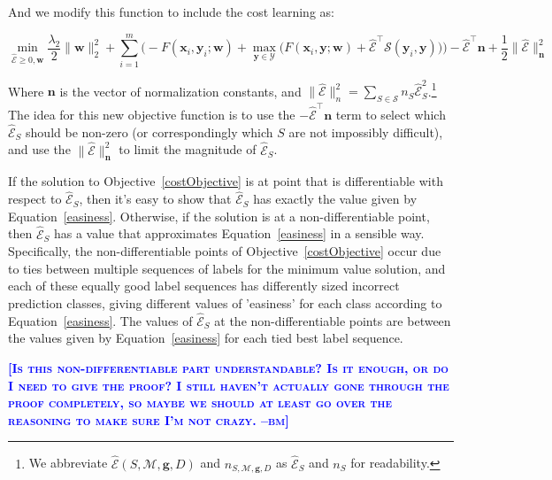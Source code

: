 \documentclass{article} %
\newcommand{\bmcomment}[1]{\textcolor{blue}{\textsc{\textbf{[#1 --bm]}}}}
\begin{document}
And we modify this function to include the cost learning as:

\begin{equation}
\label{costObjective}
\min_{\mathbf{\mathcal{\hat{E}}}\geq 0,\mathbf{w}} \frac{\lambda_2}{2}\|\mathbf{w}\|_2^2 + \sum_{i=1}^m\bigg(-F(\mathbf{x}_i,\mathbf{y}_i;\mathbf{w})+\max_{\mathbf{y}\in \mathcal{Y}}\Big(F(\mathbf{x}_i,\mathbf{y};\mathbf{w})+\mathbf{\mathcal{\hat{E}}}^\top \mathbf{\mathcal{S}}(\mathbf{y}_i,\mathbf{y})\Big)\bigg)-\mathbf{\mathcal{\hat{E}}}^\top\mathbf{n}+\frac{1}{2}\|\mathbf{\mathcal{\hat{E}}}\|^2_\mathbf{n}
\end{equation}

Where $\mathbf{n}$ is the vector of normalization constants, and 
$\|\mathbf{\mathcal{\hat{E}}}\|^2_n=\sum_{S\in\mathcal{S}}n_S\mathcal{\hat{E}}_S^2$.\footnote{
  We abbreviate $\mathcal{\hat{E}}(S,\mathcal{M},\mathbf{g},D)$ and 
 $n_{S,\mathcal{M},\mathbf{g},D}$ as $\mathcal{\hat{E}}_S$ and $n_S$ for 
 readability.
}
The idea for this new objective function is to use the 
$-\mathbf{\mathcal{\hat{E}}}^\top\mathbf{n}$ term to select which 
$\mathcal{\hat{E}}_S$
should be non-zero (or correspondingly which $S$ are not 
impossibly difficult), and use the $\|\mathcal{\hat{E}}\|^2_\mathbf{n}$ 
to limit the magnitude of $\mathcal{\hat{E}}_S$.

If the solution to Objective~\ref{costObjective} is at point that is 
differentiable with respect to $\mathcal{\hat{E}}_S$, then it's easy to 
show that $\mathcal{\hat{E}}_S$ has exactly the value given by 
Equation~\ref{easiness}.
Otherwise, if the solution is at a non-differentiable point, then 
$\mathcal{\hat{E}}_S$ has a value that approximates Equation~\ref{easiness} in a sensible way.  Specifically, the non-differentiable points of Objective~\ref{costObjective}
occur due to ties between multiple sequences of labels for the 
minimum value solution, and each of these equally good label sequences has 
differently sized incorrect prediction classes, giving different
values of 'easiness' for each class according to Equation~\ref{easiness}.
The values of $\mathcal{\hat{E}}_S$ at the non-differentiable
points are between the values given by Equation~\ref{easiness}
for each tied best label sequence.

\bmcomment{Is this non-differentiable part understandable?  Is it enough,
or do I need to give the proof?  I still haven't actually gone through
the proof completely, so maybe we should at least go over the reasoning
to make sure I'm not crazy.}
\end{document}
